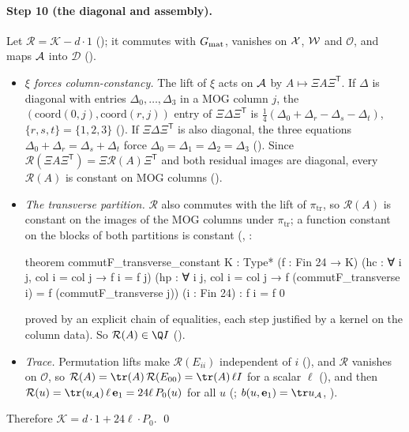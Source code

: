 \paragraph{Step 10 (the diagonal and assembly).}  Let $\mathcal R=\mathcal K-d\cdot1$ (); it commutes with
$G_{\mathrm{mat}}$, vanishes on $\mathcal{X}$, $\mathcal{W}$ and $\mathcal O$, and maps $\mathcal{A}$ into $\mathcal D$
().
\begin{itemize}
\item \emph{$\xi$ forces column-constancy.}  The lift of $\xi$ acts on $\mathcal{A}$ by $A\mapsto\Xi A\Xi^{\mathsf T}$.  If
  $\Delta$ is diagonal with entries $\Delta_0,\dots,\Delta_3$ in a MOG column $j$, the $(\mathrm{coord}(0,j),\mathrm{coord}(r,j))$
  entry of $\Xi\Delta\Xi^{\mathsf T}$ is $\tfrac14(\Delta_0+\Delta_r-\Delta_s-\Delta_t)$, $\{r,s,t\}=\{1,2,3\}$
  ().  If $\Xi\Delta\Xi^{\mathsf T}$ is also diagonal, the three equations
  $\Delta_0+\Delta_r=\Delta_s+\Delta_t$ force $\Delta_0=\Delta_1=\Delta_2=\Delta_3$ ().  Since
  $\mathcal R(\Xi A\Xi^{\mathsf T})=\Xi\mathcal R(A)\Xi^{\mathsf T}$ and both residual images are diagonal, every $\mathcal R(A)$ is
  constant on MOG columns ().
\item \emph{The transverse partition.}  $\mathcal R$ also commutes with the lift of $\pi_{\mathrm{tr}}$, so $\mathcal R(A)$ is
  constant on the images of the MOG columns under $\pi_{\mathrm{tr}}$; a function constant on the blocks of both partitions is
  constant (, :
\begin{leancode}
theorem commutF_transverse_constant {K : Type*} (f : Fin 24 → K)
    (hc : ∀ i j, col i = col j → f i = f j)
    (hp : ∀ i j, col i = col j → f (commutF_transverse i) =
      f (commutF_transverse j)) (i : Fin 24) : f i = f 0
\end{leancode}
  proved by an explicit chain of equalities, each step justified by a kernel  on the column data).  So
  $\mathcal R(A)\in\Q I$ ().
\item \emph{Trace.}  Permutation lifts make $\mathcal R(E_{ii})$ independent of $i$ (), and
  $\mathcal R$ vanishes on $\mathcal O$, so $\mathcal R(A)=\tr(A)\,\mathcal R(E_{00})=\tr(A)\,\ell I$ for a scalar $\ell$
  (), and then $\mathcal R(u)=\tr(u_{\chtwentytwoA})\,\ell\,\mathbf{e}_1=24\ell\,P_0(u)$ for all $u$
  (; $b(u,\mathbf{e}_1)=\tr u_{\chtwentytwoA}$, ).
\end{itemize}
Therefore $\mathcal K=d\cdot1+24\ell\cdot P_0$. \qed


